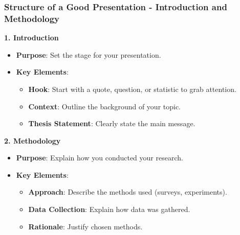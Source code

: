 \documentclass[aspectratio=169]{beamer}
\begin{document}
\begin{frame}[fragile]
    \frametitle{Structure of a Good Presentation - Introduction and Methodology}
    
    \textbf{1. Introduction}
    \begin{itemize}
        \item \textbf{Purpose}: Set the stage for your presentation.
        \item \textbf{Key Elements}:
        \begin{itemize}
            \item \textbf{Hook}: Start with a quote, question, or statistic to grab attention.
            \item \textbf{Context}: Outline the background of your topic.
            \item \textbf{Thesis Statement}: Clearly state the main message.
        \end{itemize}
    \end{itemize}
    
    \textbf{2. Methodology}
    \begin{itemize}
        \item \textbf{Purpose}: Explain how you conducted your research.
        \item \textbf{Key Elements}:
        \begin{itemize}
            \item \textbf{Approach}: Describe the methods used (surveys, experiments).
            \item \textbf{Data Collection}: Explain how data was gathered.
            \item \textbf{Rationale}: Justify chosen methods.
        \end{itemize}
    \end{itemize}
\end{frame}
\end{document}
